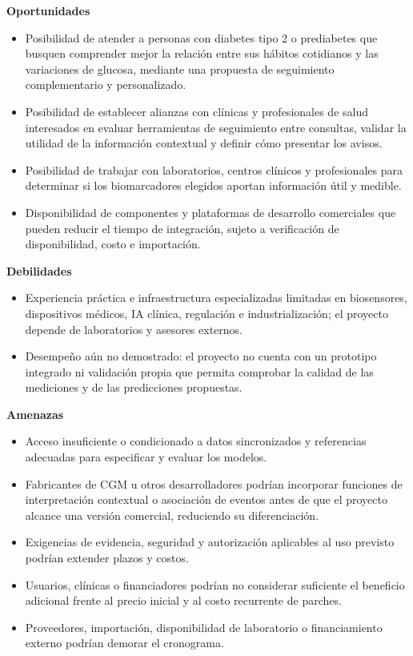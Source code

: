 \noindent\textbf{Oportunidades}
\begin{itemize}
    \item Posibilidad de atender a personas con diabetes tipo 2 o prediabetes que busquen comprender mejor la relación entre sus hábitos cotidianos y las variaciones de glucosa, mediante una propuesta de seguimiento complementario y personalizado.
    \item Posibilidad de establecer alianzas con clínicas y profesionales de salud interesados en evaluar herramientas de seguimiento entre consultas, validar la utilidad de la información contextual y definir cómo presentar los avisos.
    \item Posibilidad de trabajar con laboratorios, centros clínicos y profesionales para determinar si los biomarcadores elegidos aportan información útil y medible.
    \item Disponibilidad de componentes y plataformas de desarrollo comerciales que pueden reducir el tiempo de integración, sujeto a verificación de disponibilidad, costo e importación.
\end{itemize}

\noindent\textbf{Debilidades}
\begin{itemize}
    \item Experiencia práctica e infraestructura especializadas limitadas en biosensores, dispositivos médicos, IA clínica, regulación e industrialización; el proyecto depende de laboratorios y asesores externos.
    \item Desempeño aún no demostrado: el proyecto no cuenta con un prototipo integrado ni validación propia que permita comprobar la calidad de las mediciones y de las predicciones propuestas.
\end{itemize}

\noindent\textbf{Amenazas}
\begin{itemize}
    \item Acceso insuficiente o condicionado a datos sincronizados y referencias adecuadas para especificar y evaluar los modelos.
    \item Fabricantes de CGM u otros desarrolladores podrían incorporar funciones de interpretación contextual o asociación de eventos antes de que el proyecto alcance una versión comercial, reduciendo su diferenciación.
    \item Exigencias de evidencia, seguridad y autorización aplicables al uso previsto podrían extender plazos y costos.
    \item Usuarios, clínicas o financiadores podrían no considerar suficiente el beneficio adicional frente al precio inicial y al costo recurrente de parches.
    \item Proveedores, importación, disponibilidad de laboratorio o financiamiento externo podrían demorar el cronograma.
\end{itemize}





